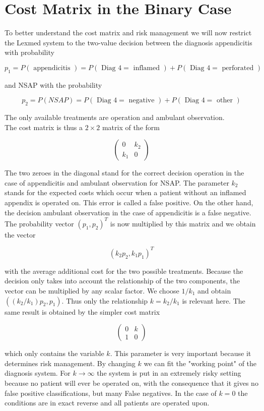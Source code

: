\documentclass[10pt]{article}
\begin{document}
\section*{Cost Matrix in the Binary Case}
To better understand the cost matrix and risk management we will now restrict the Lexmed system to the two-value decision between the diagnosis appendicitis with probability

$$
p_{1}=P(\text { appendicitis })=P(\text { Diag } 4=\text { inflamed })+P(\text { Diag } 4=\text { perforated })
$$

and NSAP with the probability

$$
p_{2}=P(N S A P)=P(\text { Diag } 4=\text { negative })+P(\text { Diag } 4=\text { other })
$$

The only available treatments are operation and ambulant observation.\\
The cost matrix is thus a $2 \times 2$ matrix of the form

$$
\left(\begin{array}{cc}
0 & k_{2} \\
k_{1} & 0
\end{array}\right)
$$

The two zeroes in the diagonal stand for the correct decision operation in the case of appendicitis and ambulant observation for NSAP. The parameter $k_{2}$ stands for the expected costs which occur when a patient without an inflamed appendix is operated on. This error is called a false positive. On the other hand, the decision ambulant observation in the case of appendicitis is a false negative. The probability vector $\left(p_{1}, p_{2}\right)^{T}$ is now multiplied by this matrix and we obtain the vector

$$
\left(k_{2} p_{2}, k_{1} p_{1}\right)^{T}
$$

with the average additional cost for the two possible treatments. Because the decision only takes into account the relationship of the two components, the vector can be multiplied by any scalar factor. We choose $1 / k_{1}$ and obtain $\left(\left(k_{2} / k_{1}\right) p_{2}, p_{1}\right)$. Thus only the relationship $k=k_{2} / k_{1}$ is relevant here. The same result is obtained by the simpler cost matrix

$$
\left(\begin{array}{ll}
0 & k \\
1 & 0
\end{array}\right)
$$

which only contains the variable $k$. This parameter is very important because it determines risk management. By changing $k$ we can fit the "working point" of the diagnosis system. For $k \rightarrow \infty$ the system is put in an extremely risky setting because no patient will ever be operated on, with the consequence that it gives no false positive classifications, but many False negatives. In the case of $k=0$ the conditions are in exact reverse and all patients are operated upon.
\end{document}
